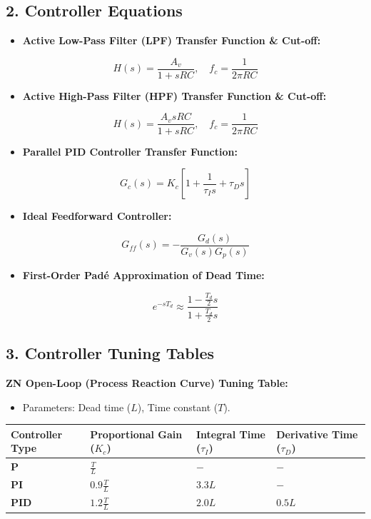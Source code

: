 \subsection{2. Controller Equations}
\begin{itemize}
  \item \textbf{Active Low-Pass Filter (LPF) Transfer Function \& Cut-off:}
\end{itemize}
  \[ H(s) = \frac{A_v}{1 + sRC}, \quad f_c = \frac{1}{2\pi RC} \]
\begin{itemize}
  \item \textbf{Active High-Pass Filter (HPF) Transfer Function \& Cut-off:}
\end{itemize}
  \[ H(s) = \frac{A_v sRC}{1 + sRC}, \quad f_c = \frac{1}{2\pi RC} \]
\begin{itemize}
  \item \textbf{Parallel PID Controller Transfer Function:}
\end{itemize}
  \[ G_c(s) = K_c \left[ 1 + \frac{1}{\tau_I s} + \tau_D s \right] \]
\begin{itemize}
  \item \textbf{Ideal Feedforward Controller:}
\end{itemize}
  \[ G_{ff}(s) = -\frac{G_d(s)}{G_v(s) G_p(s)} \]
\begin{itemize}
  \item \textbf{First-Order Padé Approximation of Dead Time:}
\end{itemize}
  \[ e^{-s T_d} \approx \frac{1 - \frac{T_d}{2} s}{1 + \frac{T_d}{2} s} \]


\subsection{3. Controller Tuning Tables}

\textbf{ZN Open-Loop (Process Reaction Curve) Tuning Table:}
\begin{itemize}
  \item Parameters: Dead time ($L$), Time constant ($T$).
\end{itemize}
\begin{table}[H]
\centering
\begin{tabular}{|p{}|p{}|p{}|p{}|}
\hline
Controller Type & Proportional Gain ($K_c$) & Integral Time ($\tau_I$) & Derivative Time ($\tau_D$) \\
\hline
\textbf{P} & $\frac{T}{L}$ & $-$ & $-$ \\
\hline
\textbf{PI} & $0.9 \frac{T}{L}$ & $3.3 L$ & $-$ \\
\hline
\textbf{PID} & $1.2 \frac{T}{L}$ & $2.0 L$ & $0.5 L$ \\
\hline
\end{tabular}
\end{table}

